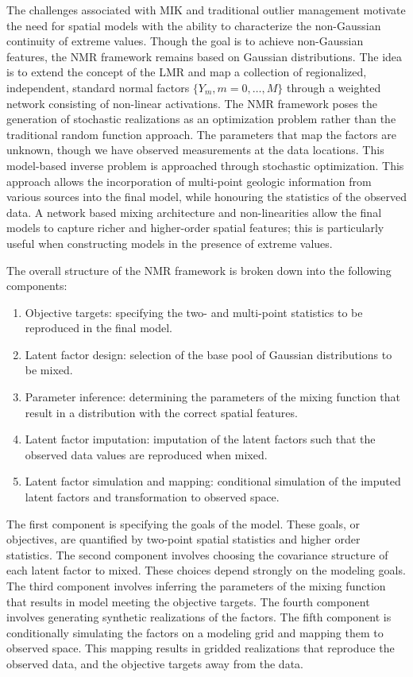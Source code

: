 The challenges associated with \gls{MIK} and traditional outlier management motivate the need for spatial models with the ability to characterize the non-Gaussian continuity of extreme values. Though the goal is to achieve non-Gaussian features, the \gls{NMR} framework remains based on Gaussian distributions. The idea is to extend the concept of the \gls{LMR} and map a collection of regionalized, independent, standard normal factors $\{ Y_{m}, m = 0, \dots, M\}$ through a weighted network consisting of non-linear activations. The \gls{NMR} framework poses the generation of stochastic realizations as an optimization problem rather than the traditional random function approach. The parameters that map the factors are unknown, though we have observed measurements at the data locations. This model-based inverse problem is approached through stochastic optimization. This approach allows the incorporation of multi-point geologic information from various sources into the final model, while honouring the statistics of the observed data. A network based mixing architecture and non-linearities allow the final models to capture richer and higher-order spatial features; this is particularly useful when constructing models in the presence of extreme values.

The overall structure of the \gls{NMR} framework is broken down into the following components:
\begin{enumerate}[noitemsep]
    \item Objective targets: specifying the two- and multi-point statistics to be reproduced in the final model.
    \item Latent factor design: selection of the base pool of Gaussian distributions to be mixed.
    \item Parameter inference: determining the parameters of the mixing function that result in a distribution with the correct spatial features.
    \item Latent factor imputation: imputation of the latent factors such that the observed data values are reproduced when mixed.
    \item Latent factor simulation and mapping: conditional simulation of the imputed latent factors and transformation to observed space.
\end{enumerate}

The first component is specifying the goals of the model. These goals, or objectives, are quantified by two-point spatial statistics and higher order statistics. The second component involves choosing the covariance structure of each latent factor to mixed. These choices depend strongly on the modeling goals. The third component involves inferring the parameters of the mixing function that results in model meeting the objective targets. The fourth component involves generating synthetic realizations of the factors. The fifth component is conditionally simulating the factors on a modeling grid and mapping them to observed space. This mapping results in gridded realizations that reproduce the observed data, and the objective targets away from the data.

